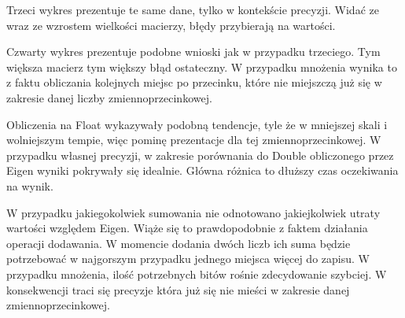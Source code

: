 \documentclass[8pt]{article}
\begin{document}
Trzeci wykres prezentuje te same dane, tylko w kontekście precyzji. Widać ze wraz ze wzrostem wielkości macierzy, błędy przybierają na wartości.
\begin{center}
\end{center}

Czwarty wykres prezentuje podobne wnioski jak w przypadku trzeciego. Tym większa macierz tym większy błąd ostateczny. W przypadku mnożenia wynika to z faktu obliczania kolejnych miejsc po przecinku, które nie miejszczą już się w zakresie danej liczby zmiennoprzecinkowej.  


Obliczenia na Float wykazywały podobną tendencje, tyle że w mniejszej skali i wolniejszym tempie, więc pominę prezentacje dla tej zmiennoprzecinkowej.
W przypadku własnej precyzji, w zakresie porównania do Double obliczonego przez Eigen wyniki pokrywały się idealnie. Główna różnica to dłuższy czas oczekiwania na wynik.

\begin{center}
\end{center}

W przypadku jakiegokolwiek sumowania nie odnotowano jakiejkolwiek utraty wartości względem  Eigen.
Wiąże się to prawdopodobnie z faktem działania operacji dodawania. W momencie dodania dwóch liczb ich 
suma będzie potrzebować w najgorszym przypadku jednego miejsca więcej do zapisu. W przypadku mnożenia, ilość potrzebnych bitów rośnie zdecydowanie szybciej. W konsekwencji traci się precyzje która już się nie mieści w zakresie danej zmiennoprzecinkowej.
\end{document}

